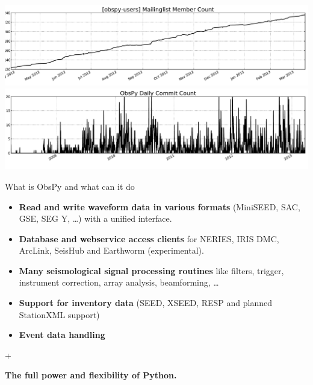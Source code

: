 \documentclass[handout]{beamer}
\begin{document}
\begin{frame}[plain]
\includegraphics[width=\textwidth]{./Scripts/ObspyMailinglist.pdf}
\vspace{5ex}
\includegraphics[width=\textwidth]{./Scripts/ObsPyDailyCommits.pdf}
\end{frame}


\begin{frame}{What is ObsPy and what can it do}
    \begin{itemize}
        \item \textbf{Read and write waveform data in various formats} (MiniSEED, SAC, GSE, SEG Y, \dots) with a unified interface.
        \item \textbf{Database and webservice access clients} for NERIES, IRIS DMC, ArcLink, SeisHub and Earthworm (experimental).
        \item \textbf{Many seismological signal processing routines} like filters, trigger, instrument correction, array analysis, beamforming, \dots
        \item \textbf{Support for inventory data} (SEED, XSEED, RESP and planned StationXML support)
        \item \textbf{Event data handling}
    \end{itemize}
    \begin{center}
        +
    \end{center}

    \begin{center}
        \textbf{The full power and flexibility of Python.}
    \end{center}

\end{frame}
\end{document}
